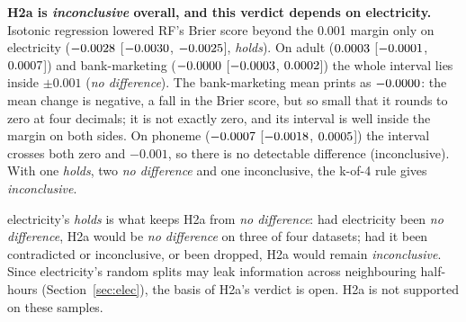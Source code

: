 \documentclass[11pt]{article}
\newcommand{\md}[3]{$#1$ [$#2$, $#3$]}
\newcommand{\ds}[1]{\textsf{#1}}
\newcommand{\ad}{\ds{adult}}
\newcommand{\bm}{\ds{bank-marketing}}
\newcommand{\el}{\ds{electricity}}
\newcommand{\ph}{\ds{phoneme}}
\newcommand{\cat}[1]{\emph{#1}}
\begin{document}
\textbf{H2a is \cat{inconclusive} overall, and this verdict depends on \el.} Isotonic
regression lowered RF's Brier score beyond the 0.001 margin only on \el{}
(\md{\HTwoAElecMean}{\HTwoAElecLo}{\HTwoAElecHi}, \cat{holds}). On \ad{}
(\md{\HTwoAAdultMean}{\HTwoAAdultLo}{\HTwoAAdultHi}) and \bm{}
(\md{\HTwoABankMean}{\HTwoABankLo}{\HTwoABankHi}) the whole interval lies inside $\pm0.001$
(\cat{no difference}). The \bm{} mean prints as $-0.0000$: the mean change is
negative, a fall in the Brier score, but so small that it rounds to zero at four decimals; it
is not exactly zero, and its interval is well inside the margin on both
sides. On \ph{} (\md{\HTwoAPhonemeMean}{\HTwoAPhonemeLo}{\HTwoAPhonemeHi}) the interval
crosses both zero and $-0.001$, so there is no detectable difference (inconclusive). With one
\cat{holds}, two \cat{no difference} and one inconclusive, the k-of-4 rule gives
\cat{inconclusive}.

\el's \cat{holds} is what keeps H2a from \cat{no difference}: had \el{} been \cat{no
difference}, H2a would be \cat{no difference} on three of four datasets; had it been
contradicted or inconclusive, or been dropped, H2a would remain \cat{inconclusive}. Since
\el's random splits may leak information across neighbouring half-hours
(Section~\ref{sec:elec}), the basis of H2a's verdict is open. H2a is not supported on these
samples.
\end{document}
